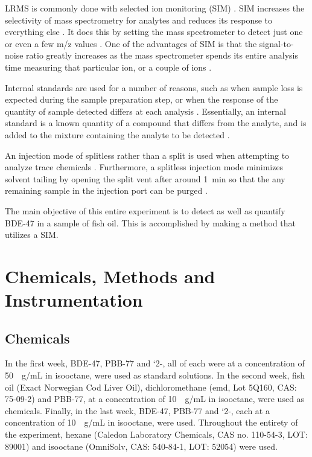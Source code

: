 \documentclass[a4paper, 12pt]{article}
\begin{document}
LRMS is commonly done with selected ion monitoring (SIM) \cite{bjorklund_mass_2003}. SIM increases the selectivity of mass spectrometry for analytes and reduces its response to everything else \cite{harris}. It does this by setting the mass spectrometer to detect just one or even a few m/z values \cite{harris}. One of the advantages of SIM is that the signal-to-noise ratio greatly increases as the mass spectrometer spends its entire analysis time measuring that particular ion, or a couple of ions \cite{harris}.

Internal standards are used for a number of reasons, such as when sample loss is expected during the sample preparation step, or when the response of the quantity of sample detected differs at each analysis \cite{harris}. Essentially, an internal standard is a known quantity of a compound that differs from the analyte, and is added to the mixture containing the analyte to be detected \cite{harris}. 

An injection mode of splitless rather than a split is used when attempting to analyze trace chemicals \cite{harris}. Furthermore, a splitless injection mode minimizes solvent tailing by opening the split vent after around \SI{1}{min} so that the any remaining sample in the injection port can be purged \cite{vitha_chromatography:_2017}.

The main objective of this entire experiment is to detect as well as quantify BDE-47 in a sample of fish oil. This is accomplished by making a method that utilizes a SIM.


\section{Chemicals, Methods and Instrumentation}

\subsection{Chemicals}
In the first week, BDE-47, PBB-77 and `2-, all of each were at a concentration of \SI{50}{\mu{}g/mL} in isooctane, were used as standard solutions. In the second week, fish oil (Exact Norwegian Cod Liver Oil), dichloromethane (emd, Lot 5Q160, CAS: 75-09-2) and PBB-77, at a concentration of \SI{10}{\mu{}g/mL} in isooctane, were used as chemicals. Finally, in the last week, BDE-47, PBB-77 and `2-, each at a concentration of \SI{10}{\mu{}g/mL} in isooctane, were used. Throughout the entirety of the experiment, hexane (Caledon Laboratory Chemicals, CAS no. 110-54-3, LOT: 89001) and isooctane (OmniSolv, CAS: 540-84-1, LOT: 52054) were used.
\end{document}

